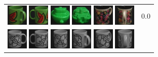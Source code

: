 \begin{figure}[tbp]
\begin{tabular}{m{11cm} | m{3cm} |}
\includegraphics[width=1cm]{coil/beeld-34.eps}
\includegraphics[width=1cm]{coil/beeld-31.eps}
\includegraphics[width=1cm]{coil/beeld-56.eps}
\includegraphics[width=1cm]{coil/beeld-59.eps}
\includegraphics[width=1cm]{coil/beeld-63.eps}
\includegraphics[width=1cm]{coil/beeld-65.eps}
& {\scriptsize 0.0}
\\
\includegraphics[width=1cm]{coil/beeld-48.eps}
\includegraphics[width=1cm]{coil/beeld-51.eps}
\includegraphics[width=1cm]{coil/beeld-52.eps}
\includegraphics[width=1cm]{coil/beeld-49.eps}
\includegraphics[width=1cm]{coil/beeld-53.eps}
\includegraphics[width=1cm]{coil/beeld-50.eps}

\end{tabular}
\end{figure}
